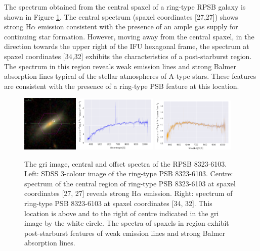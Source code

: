 The spectrum obtained from the central spaxel of a ring-type RPSB galaxy is shown in Figure \ref{fig:RPSB-8323-6103-spec}. The central spectrum (spaxel coordinates [27,27]) shows strong H$\alpha$ emission consistent with the presence of an ample gas supply for continuing star formation. However, moving away from the central spaxel, in the direction towards the upper right of the IFU hexagonal frame, the spectrum at spaxel coordinates [34,32] exhibits the characteristics of a post-starburst region. The spectrum in this region reveals weak emission lines and strong Balmer absorption lines typical of the stellar atmospheres of A-type stars. These features are consistent with the presence of a ring-type PSB feature at this location.

\begin{figure}
    \centering
    \includegraphics[width=0.24\textwidth]{images/Cutouts/RPSB-8323-6103-CIRCLED.png}
    \hfill
    \includegraphics[width=0.35\textwidth]{images/Spectra/RPSB-8323-6103-27-27.png}
    \hfill
    \includegraphics[width=0.35\textwidth]{images/Spectra/RPSB-8323-6103-34-32.png}
    \caption[Image and central and offset spectra of the RPSB 8323-6103]{The gri image, central and offset spectra of the RPSB 8323-6103. Left: SDSS 3-colour image of the ring-type PSB 8323-6103. 
    Centre: spectrum of the central region of ring-type PSB 8323-6103 at spaxel coordinates [27, 27] reveals strong H$\alpha$ emission. 
    Right: spectrum of ring-type PSB 8323-6103 at spaxel coordinates [34, 32]. This location is above and to the right of centre indicated in the gri image by the white circle. The spectra of spaxels in region exhibit post-starburst features of weak emission lines and strong Balmer absorption lines.}
    \label{fig:RPSB-8323-6103-spec}
\end{figure}

